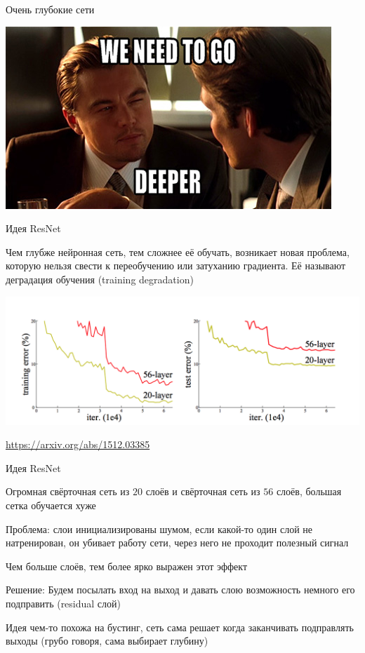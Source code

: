 \documentclass[notes,12pt, aspectratio=169]{beamer}
\newenvironment{wideitemize}{\itemize\addtolength{\itemsep}{10pt}}{\enditemize}
\begin{document}
\begin{frame}{Очень глубокие сети}
\begin{center}
	\includegraphics[width=0.8\paperwidth]{we-need-to-go-deeper.jpg}
\end{center}
\end{frame}


\begin{frame}{Идея ResNet}

Чем глубже нейронная сеть, тем сложнее её обучать, возникает новая проблема, которую нельзя свести к переобучению или затуханию градиента. \alert{Её называют деградация обучения (training degradation)}

\begin{center}
	\includegraphics[width=0.8\paperwidth]{resnet_idea.png}
\end{center}

\vfill %
\footnotesize
\color{blue} \url{https://arxiv.org/abs/1512.03385}
\end{frame}

\begin{frame}{Идея ResNet}
\begin{wideitemize}
	\item  Огромная свёрточная сеть из $20$ слоёв и свёрточная сеть из $56$ слоёв,  большая сетка обучается хуже
	\item  \alert{Проблема:} слои инициализированы шумом, если какой-то один слой не натренирован, он убивает работу сети, через него не проходит полезный сигнал 
	\item Чем больше слоёв, тем более ярко выражен этот эффект 
	\item \alert{Решение:} Будем посылать вход на выход и давать слою возможность немного его подправить (residual слой)
	\item Идея чем-то похожа на бустинг, сеть сама решает когда заканчивать подправлять выходы (грубо говоря, сама выбирает глубину)
\end{wideitemize}
\end{frame}
\end{document}
